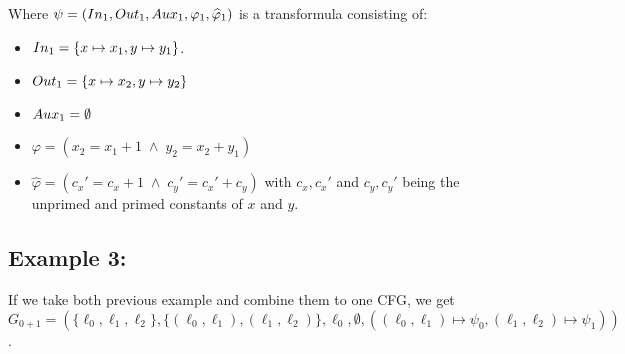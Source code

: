 \documentclass{article}
\begin{document}
	Where $\psi = (In_1, Out_1, Aux_1, \varphi_1, \widehat{\varphi}_1)$ is a transformula consisting of: 
	\begin{itemize}
		\item $In_1 = \{x \mapsto x_1, y \mapsto y_1 \}$.
		\item $Out_1 = \{ x \mapsto x_2, y \mapsto y_2 \}$
		\item $Aux_1 = \emptyset $
		\item $	\varphi = ( x_{2} = x_{1} + 1 \; \land \; y_{2} = x_{2} + y_{1} ) $
		\item $\widehat{\varphi} = ( c_{x}' = c_x + 1 \;\land\; c_{y}' = c_{x}' + c_y ) $ with $c_x, c_x'$ and $c_y, c_y'$ being the unprimed and primed constants of $x$ and $y$.
	\end{itemize}
    
	
	\subsection*{Example 3:}
	If we take both previous example and combine them to one CFG, we get \\ $G_{0+1} = (\{ \ell_0, \ell_1, \ell_2\}, \{ (\ell_0, \ell_1), (\ell_1, \ell_2)\}, \ell_0, \emptyset, ((\ell_0, \ell_1) \mapsto \psi_0, (\ell_1, \ell_2) \mapsto \psi_1))$.
	
	\bigskip
\end{document}
